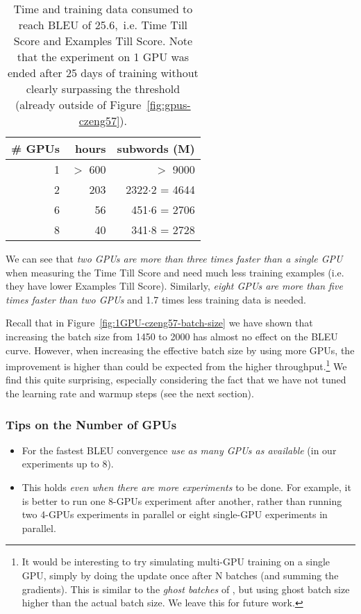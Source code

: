 \documentclass{pbmlarxiv} \pdfoutput=1
\def\recommend#1{\textsl{#1}}
\def\Fref#1{Figure~\ref{#1}}
\begin{document}
\begin{table}[ht]
\begin{center}
\begin{tabular}{rrr}\hline
\# GPUs & hours & subwords (M)\\\hline
1       & $>$ 600 &        $>$ 9000 \\
2       & 203 & 2322$\cdot$2 = 4644 \\
6       &  56 &  451$\cdot$6 = 2706 \\
8       &  40 &  341$\cdot$8 = 2728 \\\hline
\end{tabular}
\end{center}
\caption{Time and training data consumed to reach BLEU of 25.6,\
 i.e. Time Till Score and Examples Till Score.
Note that the experiment on 1 GPU was ended after 25 days of training
 without clearly surpassing the threshold
 (already outside of Figure~\ref{fig:gpus-czeng57}).
}
\label{tab:gpus-tts}
\end{table}

We can see that \recommend{two GPUs are more than three times faster than a single GPU}
 when measuring the Time Till Score
 and need much less training examples (i.e. they have lower Examples Till Score).
Similarly, \recommend{eight GPUs are more than five times faster than two GPUs}
 and 1.7 times less training data is needed.

Recall that in \Fref{fig:1GPU-czeng57-batch-size} we have shown
 that increasing the batch size from 1450 to 2000 has almost no effect on the BLEU curve.
However, when increasing the effective batch size by using more GPUs,
 the improvement is higher than could be expected from the higher throughput.\footnote{
  It would be interesting to try simulating multi-GPU training
   on a single GPU, simply by doing the update once after N batches
   (and summing the gradients).
  This is similar to the \emph{ghost batches} of \citet{hoffer-et-al-2017},
   but using ghost batch size higher than the actual batch size.
   We leave this for future work.
 }
We find this quite surprising,
 especially considering the fact
 that we have not tuned the learning rate and warmup steps (see the next section).

\subsubsection*{Tips on the Number of GPUs}
\begin{itemize}
\item For the fastest BLEU convergence \recommend{use as many GPUs as available} (in our experiments up to 8).
\item This holds \recommend{even when there are more experiments} to be done.
      For example, it is better to run one 8-GPUs experiment after another,
      rather than running two 4-GPUs experiments in parallel
      or eight single-GPU experiments in parallel.
\end{itemize}
\end{document}

